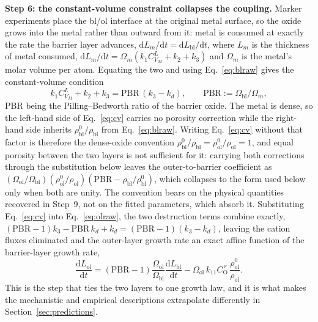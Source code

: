 \documentclass[a4paper,fleqn]{cas-sc}
\begin{document}
\textbf{Step 6: the constant-volume constraint collapses the coupling.}
Marker experiments place the bl/ol interface at the original metal
surface, so the oxide grows into the metal rather than outward from it:
metal is consumed at exactly the rate the barrier layer advances,
$\mathrm{d}L_m/\mathrm{d}t = \mathrm{d}L_\text{bl}/\mathrm{d}t$, where
$L_m$ is the thickness of metal consumed,
$\mathrm{d}L_m/\mathrm{d}t = \Omega_m (k_1 C_{V_M}^{L} + k_2 + k_3)$ and
$\Omega_m$ is the metal's molar volume per atom. Equating the two and using
Eq.~\eqref{eq:blraw} gives the constant-volume condition
\begin{equation}
k_1 C_{V_M}^{L} + k_2 + k_3 = \mathrm{PBR}\,(k_3 - k_d),
\qquad
\mathrm{PBR} := \Omega_\text{bl}/\Omega_m ,
\label{eq:cv}
\end{equation}
$\mathrm{PBR}$ being the Pilling--Bedworth ratio of the barrier oxide.
The metal is dense, so the left-hand side of Eq.~\eqref{eq:cv} carries no
porosity correction while the right-hand side inherits
$\rho^0_\text{bl}/\rho_\text{bl}$ from Eq.~\eqref{eq:blraw}. Writing
Eq.~\eqref{eq:cv} without that factor is therefore the dense-oxide
convention $\rho^0_\text{bl}/\rho_\text{bl} =
\rho^0_\text{ol}/\rho_\text{ol} = 1$, and equal porosity between the two
layers is not sufficient for it: carrying both corrections through the
substitution below leaves the outer-to-barrier coefficient as
$(\Omega_\text{ol}/\Omega_\text{bl})(\rho^0_\text{ol}/\rho_\text{ol})
(\mathrm{PBR} - \rho_\text{bl}/\rho^0_\text{bl})$, which collapses to the
form used below only when both are unity. The convention bears on the
physical quantities recovered in Step~9, not on the fitted parameters,
which absorb it.
Substituting Eq.~\eqref{eq:cv} into Eq.~\eqref{eq:olraw}, the two
destruction terms combine exactly, $(\mathrm{PBR}-1)k_3 -
\mathrm{PBR}\,k_d + k_d = (\mathrm{PBR}-1)(k_3-k_d)$, leaving the
cation fluxes eliminated and the outer-layer growth rate an exact affine
function of the barrier-layer growth rate,
\begin{equation}
\frac{\mathrm{d}L_\text{ol}}{\mathrm{d}t}
= (\mathrm{PBR}-1)\frac{\Omega_\text{ol}}{\Omega_\text{bl}}
\frac{\mathrm{d}L_\text{bl}}{\mathrm{d}t}
- \Omega_\text{ol}\, k_{11} C_\mathrm{O}^{\,r}\,
\frac{\rho^0_\text{ol}}{\rho_\text{ol}} .
\label{eq:olcoupled}
\end{equation}
This is the step that ties the two layers to one growth law, and it is
what makes the mechanistic and empirical descriptions extrapolate
differently in Section~\ref{sec:predictions}.
\end{document}
